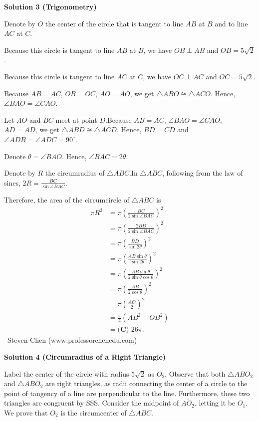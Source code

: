 \begin{enumerate}
\textbf{Solution 3 (Trigonometry)}

Denote by $O$ the center of the circle that is tangent to line $AB$ at $B$ and to line $AC$ at $C$.

 Because this circle is tangent to line $AB$ at $B$, we have $OB \perp AB$ and $OB = 5 \sqrt{2}$.

 Because this circle is tangent to line $AC$ at $C$, we have $OC \perp AC$ and $OC = 5 \sqrt{2}$.

 Because $AB = AC$, $OB = OC$, $AO = AO$, we get $\triangle ABO \cong \triangle ACO$. Hence, $\angle BAO = \angle CAO$.

 Let $AO$ and $BC$ meet at point $D$.Because $AB = AC$, $\angle BAO = \angle CAO$, $AD = AD$, we get $\triangle ABD \cong \triangle ACD$. Hence, $BD = CD$ and $\angle ADB = \angle ADC = 90^\circ$.

 Denote $\theta = \angle BAO$. Hence, $\angle BAC = 2 \theta$.

 Denote by $R$ the circumradius of $\triangle ABC$.In $\triangle ABC$, following from the law of sines, $2 R = \frac{BC}{\sin \angle BAC}$.

 Therefore, the area of the circumcircle of $\triangle ABC$ is
 \begin{align*} \pi R^2 & = \pi \left( \frac{BC}{2 \sin \angle BAC} \right)^2 \\ & = \pi \left( \frac{2 BD}{2 \sin \angle BAC} \right)^2 \\ & = \pi \left( \frac{BD}{\sin 2 \theta} \right)^2 \\ & = \pi \left( \frac{AB \sin \theta }{\sin 2 \theta} \right)^2 \\ & = \pi \left( \frac{AB \sin \theta }{2 \sin \theta \cos \theta} \right)^2 \\ & = \pi \left( \frac{AB }{2 \cos \theta} \right)^2 \\ & = \pi \left( \frac{AO}{2} \right)^2 \\ & = \frac{\pi}{4} \left( AB^2 + OB^2 \right) \\ & = \boxed{\textbf{(C) }26\pi}. \end{align*}
~Steven Chen (www.professorchenedu.com)

 



\textbf{Solution 4 (Circumradius of a Right Triangle)}

Label the center of the circle with radius $5\sqrt{2}$ as $O_2$. Observe that both $\triangle ABO_2$ and $\triangle ABO_2$ are right triangles, as radii connecting the center of a circle to the point of tangency of a line are perpendicular to the line. Furthermore, these two triangles are congruent by SSS. Consider the midpoint of $\overline{AO_2}$, letting it be $O_1$. We prove that $O_2$ is the circumcenter of $\triangle ABC$.


\end{enumerate}
